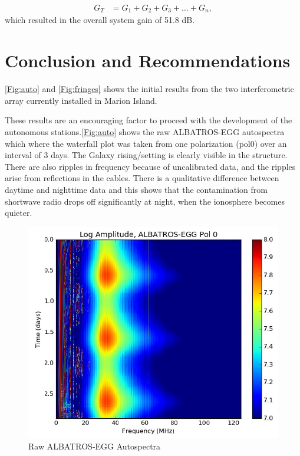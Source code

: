 \documentclass[12pt,a4paper]{report}
\begin{document}
\begin{equation} \label{eq2.4}
	\begin{split}
	G_{T} & = G_{1} + G_{2} + G_{3} + ... + G_{n}, 				
	\end{split}
\end{equation}
which resulted in the overall system gain of 51.8 dB.

\chapter{Conclusion and Recommendations}

\autoref{Fig:auto} and \autoref{Fig:fringes} shows the initial results from the two interferometric array currently installed in Marion Island. 

These results are an encouraging factor to proceed with the development of the autonomous stations.\autoref{Fig:auto} shows the raw ALBATROS-EGG autospectra which where the waterfall plot was taken from one polarization (pol0) over an interval of 3 days. The Galaxy rising/setting is clearly visible in the structure. There are also ripples in frequency because of uncalibrated data, and the ripples arise from reflections in the cables. There is a qualitative difference between daytime and nighttime data and this shows that the contamination from shortwave radio drops off significantly at night, when the ionosphere becomes quieter.

\begin{figure}[h!]
	\begin{center}
		\includegraphics[width=0.8\linewidth]{Figures/Raw-ALBATROS-autospectra.PNG}
		\caption{Raw ALBATROS-EGG Autospectra}
		\label{Fig:auto}
	\end{center}
\end{figure}
\end{document}

